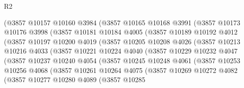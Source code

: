\begin{lexlean}{R2}
\begin{coremodule}
                (@3857
                  @10157
                  @10160
                  @3984
                  (@3857
                    @10165
                    @10168
                    @3991
                    (@3857
                      @10173
                      @10176
                      @3998
                      (@3857
                        @10181
                        @10184
                        @4005
                        (@3857
                          @10189
                          @10192
                          @4012
                          (@3857
                            @10197
                            @10200
                            @4019
                            (@3857
                              @10205
                              @10208
                              @4026
                              (@3857
                                @10213
                                @10216
                                @4033
                                (@3857
                                  @10221
                                  @10224
                                  @4040
                                  (@3857
                                    @10229
                                    @10232
                                    @4047
                                    (@3857
                                      @10237
                                      @10240
                                      @4054
                                      (@3857
                                        @10245
                                        @10248
                                        @4061
                                        (@3857
                                          @10253
                                          @10256
                                          @4068
                                          (@3857
                                            @10261
                                            @10264
                                            @4075
                                            (@3857
                                              @10269
                                              @10272
                                              @4082
                                              (@3857
                                                @10277
                                                @10280
                                                @4089
                                                (@3857
                                                  @10285

\end{coremodule}
\end{lexlean}
